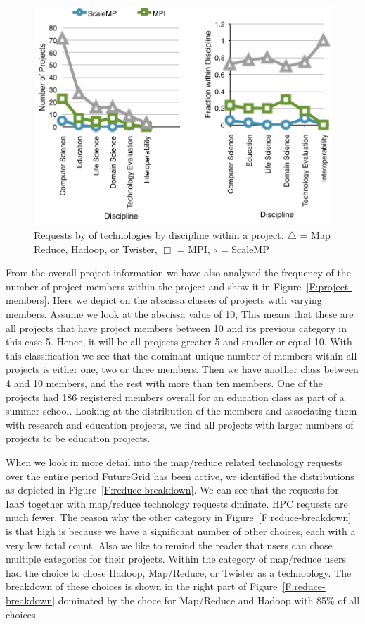 \documentclass[graybox]{svmult}
\begin{document}
\begin{figure}[p]
  \centering
    \includegraphics[width=.75\textwidth]{images/trend-b.pdf}
  \caption{Requests by of technologies by discipline within a
    project. $\bigtriangleup$ = Map Reduce, Hadoop, or Twister,
    $\Box$  = MPI, $\circ$ = ScaleMP}
   \label{F:trend-b}
\end{figure}


From the overall project information we have also analyzed the frequency of the number of project members within the project and show it in Figure~\ref{F:project-members}. Here we depict on the abscissa classes of projects with varying members.  Assume we look at the abscissa value of 10, This means that these are all projects that have project members between 10 and its previous category in this case 5. Hence, it will be all projects greater 5 and smaller or equal 10. With this classification we see that the dominant unique number of members within all projects is either one, two or three members. Then we have another class between 4 and 10 members, and the rest with more than ten members. One of the projects had 186 registered members overall for an education class as part of a summer school. Looking at the distribution of the members and associating them with research and education projects, we find all projects with larger numbers of projects to be education projects.

When we look in more detail into the map/reduce related technology requests over the entire period FutureGrid has been active, we identified the distributions as depicted in Figure~\ref{F:reduce-breakdown}.  We can see that the requests for IaaS together with map/reduce technology requests dminate. HPC requests are much fewer. The reason why the other category in Figure~\ref{F:reduce-breakdown} is that high is because we have a significant number of other choices, each with a very low total count. Also we like to remind the reader that users can chose multiple categories for their projects. Within the category of map/reduce users had the choice to chose Hadoop, Map/Reduce, or Twister as a technoology. The breakdown of these choices is shown in the right part of Figure~\ref{F:reduce-breakdown} dominated by the choce for Map/Reduce and Hadoop with 85\% of all choices.
\end{document}
